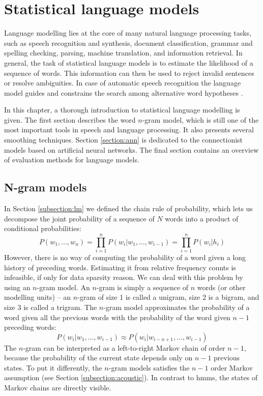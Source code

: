 \chapter{Statistical language models}
\label{chapter:lm}
Language modelling lies at the core of many natural language processing tasks, such as speech recognition and synthesis, document classification, grammar and spelling checking, parsing, machine translation, and information retrieval. In general, the task of statistical language models is to estimate the likelihood of a sequence of words. This information can then be used to reject invalid sentences or resolve ambiguities. In case of automatic speech recognition the language model guides and constrains the search among alternative word hypotheses \cite{glass2013automatic}.

In this chapter, a thorough introduction to statistical language modelling is given. The first section describes the word $n$-gram model, which is still one of the most important tools in speech and language processing. It also presents several smoothing techniques. Section \ref{section:ann} is dedicated to the connectionist models based on artificial neural networks. The final section contains an overview of evaluation methods for language models.
\section{N-gram models}
\label{section:ngrams}
In Section \ref{subsection:lm} we defined the chain rule of probability, which lets us decompose the joint probability of a sequence of $N$ words into a product of conditional probabilities:
\begin{equation}
	P(w_{1}, \dots, w_{n})=\prod_{i=1}^{n}P(w_{i}|w_{1},\dots,w_{i-1})=\prod_{i=1}^{n}P(w_{i}|h_{i})
\end{equation}
However, there is no way of computing the probability of a word given a long history of preceding words. Estimating it from relative frequency counts is infeasible, if only for data sparsity reason. We can deal with this problem by using an $n$-gram model. An $n$-gram is simply a sequence of $n$ words (or other modelling units) -- an $n$-gram of size 1 is called a unigram, size 2 is a bigram, and size 3 is called a trigram. The $n$-gram model approximates the probability of a word given all the previous words with the probability of the word given $n-1$ preceding words:
\begin{equation}
	P(w_{i}|w_{1},\dots,w_{i-1})\approx P(w_{i}|w_{i-n+1},\dots,w_{i-1})
\end{equation}
The $n$-gram can be interpreted as a left-to-right Markov chain of order $n-1$, because the probability of the current state depends only on $n-1$ previous states. To put it differently, the $n$-gram models satisfies the $n-1$ order Markov assumption (see Section \ref{subsection:acoustic}). In contrast to \glspl{hmm}, the states of Markov chains are directly visible.
